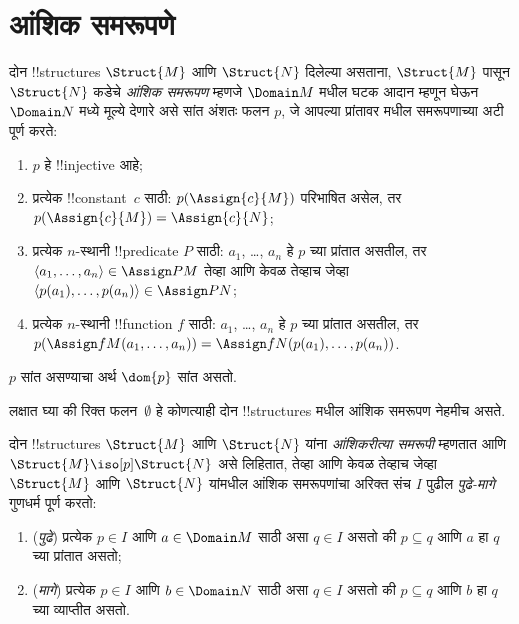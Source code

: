 \documentclass[../../../include/open-logic-section]{subfiles}
\begin{document}
\section{आंशिक समरूपणे}

\begin{defn}
  दोन !!{structure}s $\Struct{M}$ आणि $\Struct{N}$ दिलेल्या असताना,
  $\Struct{M}$ पासून $\Struct{N}$ कडेचे \emph{आंशिक समरूपण} म्हणजे
  $\Domain M$ मधील घटक आदान म्हणून घेऊन $\Domain N$ मध्ये मूल्ये देणारे
  असे सांत अंशतः फलन $p$, जे आपल्या प्रांतावर
   मधील समरूपणाच्या अटी पूर्ण करते:
  \begin{enumerate}
  \item $p$ हे !!{injective} आहे;
  \item प्रत्येक !!{constant}~$c$ साठी: $p(\Assign{c}{M})$ परिभाषित
    असेल, तर $p(\Assign{c}{M}) = \Assign{c}{N}$;
  \item प्रत्येक $n$-स्थानी !!{predicate} $P$ साठी: $a_1$, \dots, $a_n$
    हे $p$ च्या प्रांतात असतील, तर $\langle a_1, \dots, a_n\rangle \in
    \Assign P M$ तेव्हा आणि केवळ तेव्हाच जेव्हा $\langle p(a_1), \dots, p(a_n) \rangle
    \in \Assign P N$;
  \item प्रत्येक $n$-स्थानी !!{function} $f$ साठी: $a_1$, \dots, $a_n$
    हे $p$ च्या प्रांतात असतील, तर $p(\Assign f M (a_1, \dots,a_n))
    = \Assign f N (p(a_1), \dots, p(a_n))$.
  \end{enumerate}
  $p$ सांत असण्याचा अर्थ $\dom{p}$ सांत असतो.
\end{defn}

लक्षात घ्या की रिक्त फलन~$\emptyset$ हे कोणत्याही दोन !!{structure}s
मधील आंशिक समरूपण नेहमीच असते.

\begin{defn}
  दोन !!{structure}s $\Struct{M}$ आणि $\Struct{N}$ यांना
  \emph{आंशिकरीत्या समरूपी} म्हणतात आणि $\Struct{M} \iso[p]
  \Struct{N}$ असे लिहितात, तेव्हा आणि केवळ तेव्हाच जेव्हा
  $\Struct{M}$ आणि $\Struct{N}$ यांमधील आंशिक समरूपणांचा अरिक्त संच $I$
  पुढील \emph{पुढे-मागे} गुणधर्म पूर्ण करतो:
  \begin{enumerate}
  \item (\emph{पुढे}) प्रत्येक $p \in I$ आणि $a \in \Domain M$ साठी असा
    $q \in I$ असतो की $p \subseteq q$ आणि $a$ हा $q$ च्या प्रांतात
    असतो;
  \item (\emph{मागे}) प्रत्येक $p \in I$ आणि $b \in \Domain N$ साठी असा
    $q \in I$ असतो की $p \subseteq q$ आणि $b$ हा $q$ च्या व्याप्तीत
    असतो.
  \end{enumerate}
\end{defn}
\end{document}
